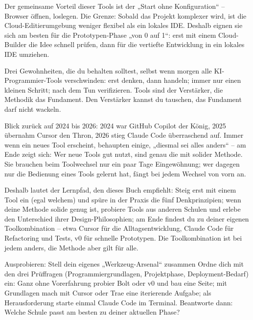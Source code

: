 Der gemeinsame Vorteil dieser Tools ist der „Start ohne Konfiguration“ – Browser öffnen, loslegen. Die Grenze: Sobald das Projekt komplexer wird, ist die Cloud-Editierumgebung weniger flexibel als ein lokales IDE. Deshalb eignen sie sich am besten für die Prototypen-Phase „von 0 auf 1“: erst mit einem Cloud-Builder die Idee schnell prüfen, dann für die vertiefte Entwicklung in ein lokales IDE umziehen.


Drei Gewohnheiten, die du behalten solltest, selbst wenn morgen alle KI-Programmier-Tools verschwinden: erst denken, dann handeln; immer nur einen kleinen Schritt; nach dem Tun verifizieren. Tools sind der Verstärker, die Methodik das Fundament. Den Verstärker kannst du tauschen, das Fundament darf nicht wackeln.

Blick zurück auf 2024 bis 2026: 2024 war GitHub Copilot der König, 2025 übernahm Cursor den Thron, 2026 stieg Claude Code überraschend auf. Immer wenn ein neues Tool erscheint, behaupten einige, „diesmal sei alles anders“ – am Ende zeigt sich: Wer neue Tools gut nutzt, sind genau die mit solider Methode. Sie brauchen beim Toolwechsel nur ein paar Tage Eingewöhnung; wer dagegen nur die Bedienung eines Tools gelernt hat, fängt bei jedem Wechsel von vorn an.

Deshalb lautet der Lernpfad, den dieses Buch empfiehlt: Steig erst mit einem Tool ein (egal welchem) und spüre in der Praxis die fünf Denkprinzipien; wenn deine Methode solide genug ist, probiere Tools aus anderen Schulen und erlebe den Unterschied ihrer Design-Philosophien; am Ende findest du zu deiner eigenen Toolkombination – etwa Cursor für die Alltagsentwicklung, Claude Code für Refactoring und Tests, v0 für schnelle Prototypen. Die Toolkombination ist bei jedem anders, die Methode aber gilt für alle.

\begin{tcbpractice}{Ausprobieren: Stell dein eigenes „Werkzeug-Arsenal“ zusammen}
Ordne dich mit den drei Prüffragen (Programmiergrundlagen, Projektphase, Deployment-Bedarf) ein: Ganz ohne Vorerfahrung probier Bolt oder v0 und bau eine Seite; mit Grundlagen mach mit Cursor oder Trae eine iterierende Aufgabe; als Herausforderung starte einmal Claude Code im Terminal. Beantworte dann: Welche Schule passt am besten zu deiner aktuellen Phase?

\end{tcbpractice}


